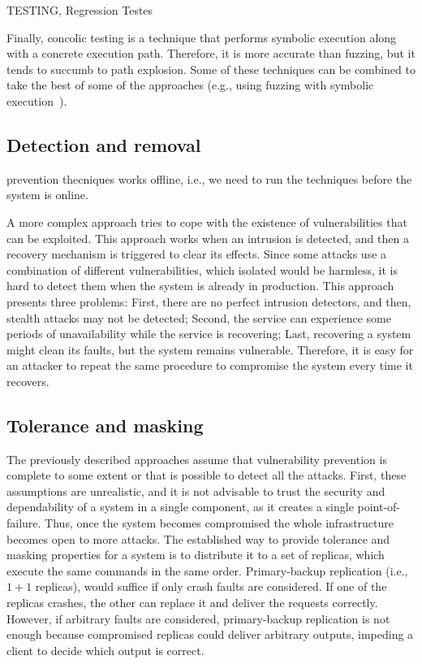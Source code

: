 TESTING, Regression Testes~\cite{Xiao:2017}

Finally, concolic testing is a technique that performs symbolic execution along with a concrete execution path. 
Therefore, it is more accurate than fuzzing, but it tends to succumb to path explosion.
Some of these techniques can be combined to take the best of some of the approaches (e.g., using fuzzing with symbolic execution~\cite{Stephens:2016}).


\subsection{Detection and removal}
prevention thecniques works offline, i.e., we need to run the techniques before the system is online.

A more complex approach tries to cope with the existence of vulnerabilities that can be exploited.
This approach works when an intrusion is detected, and then a recovery mechanism is triggered to clear its effects. 
Since some attacks use a combination of different vulnerabilities, which isolated would be harmless, it is hard to detect them when the system is already in production. 
This approach presents three problems: 
First, there are no perfect intrusion detectors, and then, stealth attacks may not be detected; 
Second, the service can experience some periods of unavailability while the service is recovering; 
Last, recovering a system might clean its faults, but the system remains vulnerable.
Therefore, it is easy for an attacker to repeat the same procedure to compromise the system every time it recovers.


\subsection{Tolerance and masking}
The previously described approaches assume that vulnerability prevention is complete to some extent or that is possible to detect all the attacks.
First, these assumptions are unrealistic, and it is not advisable to trust the security and dependability of a system in a single component, as it creates a single point-of-failure. 
Thus, once the system becomes compromised the whole infrastructure becomes open to more attacks. 
The established way to provide tolerance and masking properties for a system is to distribute it to a set of replicas, which execute the same commands in the same order. 
Primary-backup replication (i.e., $1 + 1$ replicas), would suffice if only crash faults are considered. 
If one of the replicas crashes, the other can replace it and deliver the requests correctly.
However, if arbitrary faults are considered, primary-backup replication is not enough because compromised replicas could deliver arbitrary outputs, impeding a client to decide which output is correct.

